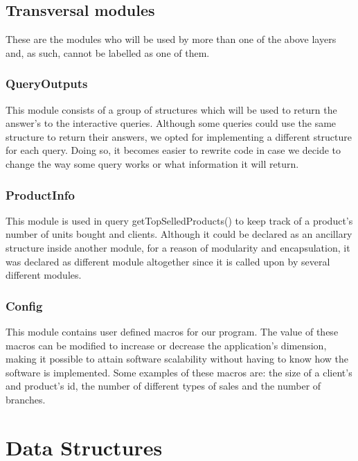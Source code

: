 \documentclass[a4paper]{report}
\begin{document}
\section{Transversal modules}
These are the modules who will be used by more than one of the above layers
and, as such, cannot be labelled as one of them.

\subsection{QueryOutputs}
This module consists of a group of structures which will be used to return the answer's to the interactive queries. 
Although some queries could use the same structure to return their answers, we opted for implementing a different structure for each query. Doing so, it becomes easier to rewrite code in case we decide to change the way some query works or what information it will return.
\subsection{ProductInfo}
This module is used in query getTopSelledProducts() to keep track of a product's number of units bought and clients. Although it could be declared as an ancillary structure inside another module, for a reason of modularity and encapsulation, it was declared as different module altogether since it is called upon by several different modules.

\subsection{Config}
This module contains user defined macros for our program. The value of these macros can be
modified to increase or decrease the application's dimension, making it possible to attain software scalability 
without having to know how the software is implemented. Some examples of these macros 
are: the size of a client's and product's id, the number of different types of sales and the number 
of branches.  



\chapter{Data Structures }\label{chap:data structures}
\end{document}
